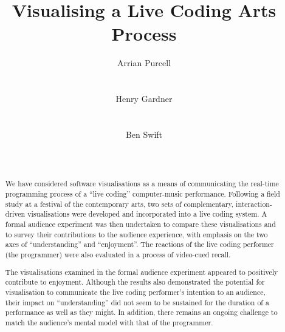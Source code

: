 \documentclass{sig-alternate}
\begin{document}

\title{Visualising a Live Coding Arts Process}

\author{
\alignauthor Arrian Purcell\\
       \\
       \\
\alignauthor Henry Gardner\\
       \\
       \\
\alignauthor Ben Swift\\
       \\
       \\
}

\maketitle
\begin{abstract}

We have considered software visualisations as a means of communicating the real-time programming process of a ``live coding'' computer-music performance. Following a field study at a festival of the contemporary arts, two sets of complementary, interaction-driven visualisations were developed and incorporated into a live coding system. A formal audience experiment was then undertaken to compare these visualisations and to survey their contributions to the audience experience, with emphasis on the two axes of ``understanding'' and ``enjoyment''. The reactions of the live coding performer (the programmer) were also evaluated in a process of video-cued recall.

The visualisations examined in the formal audience experiment appeared to positively contribute to enjoyment. Although the results also demonstrated the potential for visualisation to communicate the live coding performer's intention to an audience, their impact on ``understanding'' did not seem to be sustained for the duration of a performance as well as they might. In addition, there remains an ongoing challenge to match the audience's mental model with that of the programmer.

\end{abstract}
\end{document}
